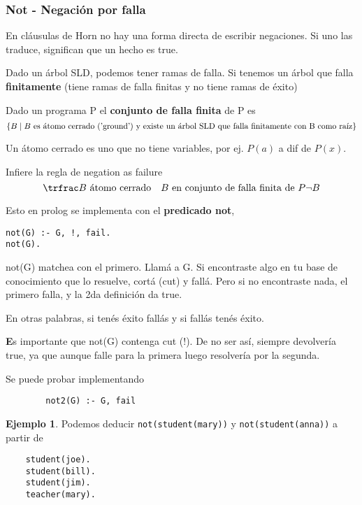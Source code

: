 \documentclass{report}
\theoremstyle{definition} %
\newtheorem*{example*}{Ejemplo}
\newenvironment{nota}[1]
    {\begin{leftbar}\textbf{#1}}
    {\end{leftbar}}
\begin{document}
\subsubsection{Not - Negación por falla}

En cláusulas de Horn no hay una forma directa de escribir negaciones. Si uno las
traduce, significan que un hecho es true.

Dado un árbol SLD, podemos tener ramas de falla. Si tenemos un árbol que falla
\textbf{finitamente} (tiene ramas de falla finitas y no tiene ramas de éxito)

Dado un programa P el \textbf{conjunto de falla finita} de P es
\[
    \{ B \mid B \text{ es átomo cerrado ('ground') y existe un árbol SLD que falla finitamente con B como raíz} \}
\]

Un átomo cerrado es uno que no tiene variables, por ej. $P(a)$ a dif de $P(x)$.

Infiere la regla de negation as failure
\[
    \resol
    {
        \text{$B$ átomo cerrado}
        \quad
        \text{$B$ en conjunto de falla finita de $P$}
    }
    {\neg B}
\]

Esto en prolog se implementa con el \textbf{predicado not},
\begin{verbatim}
not(G) :- G, !, fail.
not(G).
\end{verbatim}

not(G) matchea con el primero. Llamá a G. Si encontraste algo en tu base de
conocimiento que lo resuelve, cortá (cut) y fallá. Pero si no encontraste nada,
el primero falla, y la 2da definición da true.

En otras palabras, si tenés éxito fallás y si fallás tenés éxito.

\begin{nota}
    Es importante que not(G) contenga cut (!). De no ser así, siempre devolvería
    true, ya que aunque falle para la primera luego resolvería por la segunda.

    Se puede probar implementando
    \begin{verbatim}
        not2(G) :- G, fail
    \end{verbatim}
\end{nota}

\begin{example*}
    Podemos deducir \texttt{not(student(mary))} y \texttt{not(student(anna))} a
    partir de
    \begin{verbatim}
    student(joe).
    student(bill).
    student(jim).
    teacher(mary).
    \end{verbatim}
\end{example*}
\end{document}
